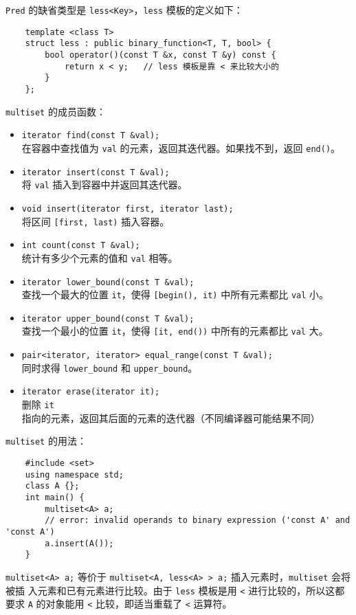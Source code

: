 \documentclass[UTF8]{ctexart}
\begin{document}
\texttt{Pred} 的缺省类型是 \texttt{less<Key>}，\texttt{less} 模板的定义如下：
\begin{verbatim}
    template <class T>
    struct less : public binary_function<T, T, bool> {
        bool operator()(const T &x, const T &y) const {
            return x < y;   // less 模板是靠 < 来比较大小的
        }
    };
\end{verbatim}

\texttt{multiset} 的成员函数：
\begin{itemize}
    \item \texttt{iterator find(const T \&val);} \\
    在容器中查找值为 \texttt{val} 的元素，返回其迭代器。如果找不到，返回 \texttt{end()}。
    \item \texttt{iterator insert(const T \&val);} \\
    将 \texttt{val} 插入到容器中并返回其迭代器。
    \item \texttt{void insert(iterator first, iterator last);} \\
    将区间 \texttt{[first, last)} 插入容器。
    \item \texttt{int count(const T \&val);} \\
    统计有多少个元素的值和 \texttt{val} 相等。
    \item \texttt{iterator lower\_bound(const T \&val);} \\
    查找一个最大的位置 \texttt{it}，使得 \texttt{[begin(), it)} 中所有元素都比 \texttt{val} 小。
    \item \texttt{iterator upper\_bound(const T \&val);} \\
    查找一个最小的位置 \texttt{it}，使得 \texttt{[it, end())} 中所有的元素都比 \texttt{val} 大。
    \item \texttt{pair<iterator, iterator> equal\_range(const T \&val);} \\
    同时求得 \texttt{lower\_bound} 和 \texttt{upper\_bound}。
    \item \texttt{iterator erase(iterator it);} \\
    删除 \texttt{it} 指向的元素，返回其后面的元素的迭代器（不同编译器可能结果不同）
\end{itemize}

\texttt{multiset} 的用法：
\begin{verbatim}
    #include <set>
    using namespace std;
    class A {};
    int main() {
        multiset<A> a;
        // error: invalid operands to binary expression ('const A' and 'const A')
        a.insert(A());
    }
\end{verbatim}
\texttt{multiset<A> a;} 等价于 \texttt{multiset<A, less<A> > a;} 插入元素时，\texttt{multiset} 会将被插
入元素和已有元素进行比较。由于 \texttt{less} 模板是用 \texttt{<} 进行比较的，所以这都要求 \texttt{A} 的对象能用
\texttt{<} 比较，即适当重载了 \texttt{<} 运算符。
\end{document}
